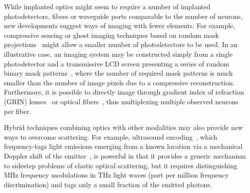 While implanted optics might seem to require a number of implanted photodetectors, fibers or waveguide ports comparable to the number of neurons, new developments suggest ways of imaging with fewer elements.
For example, compressive sensing or ghost imaging techniques based on random mask projections~\cite{wakin06,studer12,tian11,sun13} might allow a smaller number of photodetectors to be used.
In an illustrative case, an imaging system may be constructed simply from a single photodetector and a transmissive LCD screen presenting a series of random binary mask patterns~\cite{huang13}, where the number of required mask patterns is much smaller than the number of image pixels due to a compressive reconstruction.
Furthermore, it is possible to directly image through gradient index of refraction (GRIN) lenses~\cite{murray12} or optical fibers~\cite{mahalati13,kang10,flusberg05}, thus multiplexing multiple observed neurons per fiber.

Hybrid techniques combining optics with other modalities may also provide new ways to overcome scattering.
For example, ultrasound encoding~\cite{wang12}, which frequency-tags light emissions emerging from a known location via a mechanical Doppler shift of the emitter~\cite{mahan98}, is powerful in that it provides a generic mechanism to sidestep problems of elastic optical scattering, but it requires distinguishing MHz frequency modulations in THz light waves (part per million frequency discrimination) and tags only a small fraction of the emitted photons.


